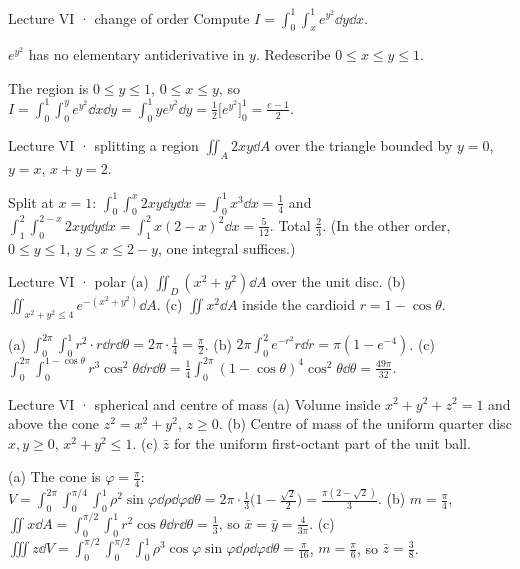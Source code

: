 \begin{problem}{Lecture VI · change of order}
Compute $I=\int_0^1\!\int_x^1e^{y^2}\dd y\dd x$.
\end{problem}
\begin{hint}$e^{y^2}$ has no elementary antiderivative in $y$. Redescribe $0\le x\le y\le1$.\end{hint}
\begin{solution}
The region is $0\le y\le1$, $0\le x\le y$, so $I=\int_0^1\!\int_0^ye^{y^2}\dd x\dd y=\int_0^1ye^{y^2}\dd y
=\tfrac12\big[e^{y^2}\big]_0^1=\tfrac{e-1}2$.
\end{solution}

\begin{problem}{Lecture VI · splitting a region}
$\iint_A2xy\dd A$ over the triangle bounded by $y=0$, $y=x$, $x+y=2$.
\end{problem}
\begin{solution}
Split at $x=1$: $\int_0^1\int_0^x2xy\dd y\dd x=\int_0^1x^3\dd x=\tfrac14$ and
$\int_1^2\int_0^{2-x}2xy\dd y\dd x=\int_1^2x(2-x)^2\dd x=\tfrac5{12}$. Total $\tfrac23$. (In the other order,
$0\le y\le1$, $y\le x\le2-y$, one integral suffices.)
\end{solution}

\begin{problem}{Lecture VI · polar}
(a) $\iint_D(x^2+y^2)\dd A$ over the unit disc. (b) $\iint_{x^2+y^2\le4}e^{-(x^2+y^2)}\dd A$.
(c) $\iint x^2\dd A$ inside the cardioid $r=1-\cos\theta$.
\end{problem}
\begin{solution}
(a) $\int_0^{2\pi}\!\int_0^1r^2\cdot r\dd r\dd\theta=2\pi\cdot\tfrac14=\tfrac\pi2$.
(b) $2\pi\int_0^2e^{-r^2}r\dd r=\pi(1-e^{-4})$.
(c) $\int_0^{2\pi}\!\int_0^{1-\cos\theta}r^3\cos^2\theta\dd r\dd\theta=\tfrac14\int_0^{2\pi}(1-\cos\theta)^4\cos^2\theta\dd\theta=\tfrac{49\pi}{32}$.
\end{solution}

\begin{problem}{Lecture VI · spherical and centre of mass}
(a) Volume inside $x^2+y^2+z^2=1$ and above the cone $z^2=x^2+y^2$, $z\ge0$.
(b) Centre of mass of the uniform quarter disc $x,y\ge0$, $x^2+y^2\le1$.
(c) $\bar z$ for the uniform first-octant part of the unit ball.
\end{problem}
\begin{solution}
(a) The cone is $\varphi=\frac\pi4$: $V=\int_0^{2\pi}\!\int_0^{\pi/4}\!\int_0^1\rho^2\sin\varphi\dd\rho\dd\varphi\dd\theta
=2\pi\cdot\tfrac13\big(1-\tfrac{\sqrt2}2\big)=\tfrac{\pi(2-\sqrt2)}3$.
(b) $m=\frac\pi4$, $\iint x\dd A=\int_0^{\pi/2}\!\int_0^1r^2\cos\theta\dd r\dd\theta=\tfrac13$, so
$\bar x=\bar y=\frac{4}{3\pi}$.
(c) $\iiint z\dd V=\int_0^{\pi/2}\!\int_0^{\pi/2}\!\int_0^1\rho^3\cos\varphi\sin\varphi\dd\rho\dd\varphi\dd\theta=\frac\pi{16}$,
$m=\frac\pi6$, so $\bar z=\frac38$.
\end{solution}

